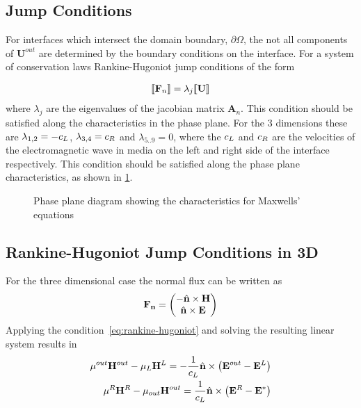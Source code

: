 \subsection{Jump Conditions}
For interfaces which intersect the domain boundary, $\partial \Omega$, the not all components of $\mathbf{U}^{out}$ are determined by the boundary conditions on the interface. For a system of conservation laws Rankine-Hugoniot jump conditions of the form

\begin{align}
\llbracket  \mathbf{F}_n  \rrbracket = \lambda_j \llbracket  \mathbf{U}  \rrbracket \label{eq:rankine-hugoniot}
\end{align}
where $\lambda_j$ are the eigenvalues of the jacobian matrix $\mathbf{A}_n$.
This condition should be satisfied along the characteristics in the phase plane.
For the 3 dimensions these are $ \lambda_{ 1,2 } = - c_{L} $, $
\lambda_{ 3,4 } = c_{R} $ and $\lambda_{5..9} = 0 $, where the
$c_{L}$ and $c_{R}$ are the velocities of the
electromagnetic wave in media on the left and right side of the interface
respectively. This condition should be satisfied along the phase plane
characteristics, as shown in \ref{fig:phase-plane-characteristics}.

\begin{figure}[h]
  \centering
  
  \caption{Phase plane diagram showing the characteristics for Maxwells' equations}
  \label{fig:phase-plane-characteristics}
\end{figure}

\subsection{Rankine-Hugoniot Jump Conditions in 3D}
For the three dimensional case the normal flux can be written as
\begin{align*}
\mathbf{\mathbf{F}_n} =
\begin{pmatrix}
- \hat{\mathbf{n}} \times \mathbf{H} \\
\hat{\mathbf{n}} \times \mathbf{E}
\end{pmatrix}
\end{align*}
Applying the condition~\eqref{eq:rankine-hugoniot} and solving the resulting linear system results in
\begin{align}
  \mu^{out} \mathbf{H}^{out} - \mu_L \mathbf{H}^{L} = - \frac{1}{c_{L}} \hat{\mathbf{n}} \times \left( \mathbf{E}^{out} - \mathbf{E}^{L} \right)
  \label{eq:jump-condition-resulting-equation-system-3D-1} \\
  \mu^{R} \mathbf{H}^{R} - \mu_{out} \mathbf{H}^{out} = \frac{1}{c_{L}} \hat{\mathbf{n}} \times \left( \mathbf{E}^{R} - \mathbf{E}^{*} \right)
  \label{eq:jump-condition-resulting-equation-system-3D-2} \\
\end{align}
